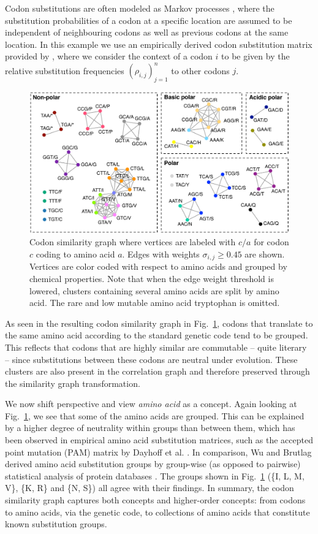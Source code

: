 \documentclass{kais}
\newcommand{\rn}[1]{\rho_{#1}}
\newcommand{\sy}[1]{\sigma_{#1}}
\begin{document}
Codon substitutions are often modeled as Markov processes \cite{Anisimova09}, where the
substitution probabilities of a codon at a specific location are assumed to be independent of neighbouring codons as
well as previous codons at the same location. In this example we use an empirically derived codon substitution matrix 
provided by , where we consider the context of a codon $i$ to be given by the relative substitution frequencies
$(\rn{i,j})_{j=1}^n$ to other codons $j$.

\begin{figure}
\centerline{\includegraphics[width=0.9\columnwidth]{figures/codon-example.pdf}}
\caption{Codon similarity graph where vertices are labeled with $c/a$ for codon $c$ coding to amino acid $a$. Edges
with weights $\sy{i,j} \geq 0.45$ are shown. Vertices are color coded with respect to amino acids and grouped by
chemical properties. Note that when the edge weight threshold is lowered, clusters containing several amino acids are split by
amino acid. The rare and low mutable amino acid tryptophan is omitted. }
\label{fig:codons}
\end{figure}

As seen in the resulting codon similarity graph in Fig.\ \ref{fig:codons}, codons that translate to the same amino acid according
to the standard genetic code \cite{Nirenberg65} tend to be grouped. This reflects that codons that are highly similar
are commutable -- quite literary -- since substitutions between these codons are neutral under evolution. These clusters are also
present in the correlation graph and therefore preserved through the similarity graph transformation.

We now shift perspective and view \emph{amino acid} as a concept. Again looking at Fig.\ \ref{fig:codons},
we see that some of the amino acids are grouped. This can be explained by a higher degree of neutrality within groups
than between them, which has been observed in empirical amino acid substitution matrices, such as the accepted point
mutation (PAM) matrix by Dayhoff et al. \cite{Dayhoff78}. In comparison, Wu and Brutlag derived amino acid substitution
groups by group-wise (as opposed to pairwise) statistical analysis of protein databases \cite{Wu96}.  The groups shown
in Fig.\ \ref{fig:codons} (\{I, L, M, V\}, \{K, R\} and \{N, S\}) all agree with their findings. In summary, the codon similarity 
graph captures both concepts and higher-order concepts: from codons to amino acids, via the genetic code,
to collections of amino acids that constitute known substitution groups.
\end{document}
